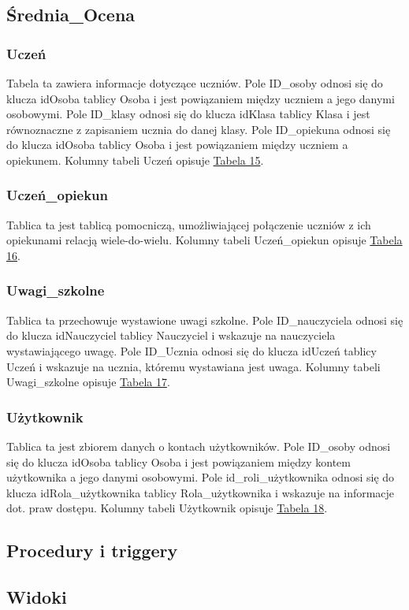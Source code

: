 \documentclass[10pt,a4paper,notitlepage]{article}
\begin{document}
\subsection{Średnia\_Ocena}
\subsubsection{Uczeń}
Tabela ta zawiera informacje dotyczące uczniów. Pole ID\_osoby odnosi się do klucza idOsoba tablicy Osoba i jest powiązaniem między uczniem a jego danymi osobowymi. Pole ID\_klasy odnosi się do klucza idKlasa tablicy Klasa i jest równoznaczne z zapisaniem ucznia do danej klasy. Pole ID\_opiekuna odnosi się do klucza idOsoba tablicy Osoba i jest powiązaniem między uczniem a opiekunem.
Kolumny tabeli Uczeń opisuje \hyperref[tab15]{Tabela 15}.
\subsubsection{Uczeń\_opiekun}
Tablica ta jest tablicą pomocniczą, umożliwiającej połączenie uczniów z ich opiekunami relacją wiele-do-wielu.
Kolumny tabeli Uczeń\_opiekun opisuje \hyperref[tab16]{Tabela 16}.
\subsubsection{Uwagi\_szkolne}
Tablica ta przechowuje wystawione uwagi szkolne. Pole ID\_nauczyciela odnosi się do klucza idNauczyciel tablicy Nauczyciel i wskazuje na nauczyciela wystawiającego uwagę. Pole ID\_Ucznia odnosi się do klucza idUczeń tablicy Uczeń i wskazuje na ucznia, któremu wystawiana jest uwaga.
Kolumny tabeli Uwagi\_szkolne opisuje \hyperref[tab17]{Tabela 17}.
\subsubsection{Użytkownik}
Tablica ta jest zbiorem danych o kontach użytkowników. Pole ID\_osoby odnosi się do klucza idOsoba tablicy Osoba i jest powiązaniem między kontem użytkownika a jego danymi osobowymi. Pole id\_roli\_użytkownika odnosi się do klucza idRola\_użytkownika tablicy Rola\_użytkownika i wskazuje na informacje dot. praw dostępu.
Kolumny tabeli Użytkownik opisuje \hyperref[tab18]{Tabela 18}.
\subsection{Procedury i triggery}
\subsection{Widoki}
\end{document}
